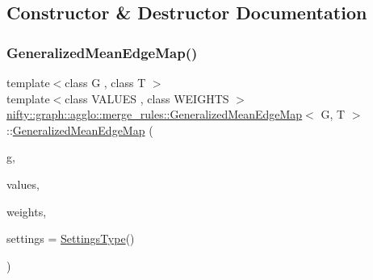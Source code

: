 \subsection{Constructor \& Destructor Documentation}
\mbox{\label{classnifty_1_1graph_1_1agglo_1_1merge__rules_1_1GeneralizedMeanEdgeMap_ac4afce4992201562e19a128e587fe6ae}} 
\subsubsection{\texorpdfstring{Generalized\+Mean\+Edge\+Map()}{GeneralizedMeanEdgeMap()}}
{\footnotesize\ttfamily template$<$class G , class T $>$ \\
template$<$class V\+A\+L\+U\+ES , class W\+E\+I\+G\+H\+TS $>$ \\
\hyperlink{classnifty_1_1graph_1_1agglo_1_1merge__rules_1_1GeneralizedMeanEdgeMap}{nifty\+::graph\+::agglo\+::merge\+\_\+rules\+::\+Generalized\+Mean\+Edge\+Map}$<$ G, T $>$\+::\hyperlink{classnifty_1_1graph_1_1agglo_1_1merge__rules_1_1GeneralizedMeanEdgeMap}{Generalized\+Mean\+Edge\+Map} (\begin{DoxyParamCaption}\item[{const \hyperlink{classnifty_1_1graph_1_1agglo_1_1merge__rules_1_1GeneralizedMeanEdgeMap_a8eb0e4528b41bb829281ea503ef0b1af}{Graph\+Type} \&}]{g,  }\item[{const V\+A\+L\+U\+ES \&}]{values,  }\item[{const W\+E\+I\+G\+H\+TS \&}]{weights,  }\item[{const \hyperlink{classnifty_1_1graph_1_1agglo_1_1merge__rules_1_1GeneralizedMeanEdgeMap_afbff572fe3361a2a080a72b4e396e4ef}{Settings\+Type} \&}]{settings = {\ttfamily \hyperlink{classnifty_1_1graph_1_1agglo_1_1merge__rules_1_1GeneralizedMeanEdgeMap_afbff572fe3361a2a080a72b4e396e4ef}{Settings\+Type}()} }\end{DoxyParamCaption})\hspace{0.3cm}{\ttfamily [inline]}}




